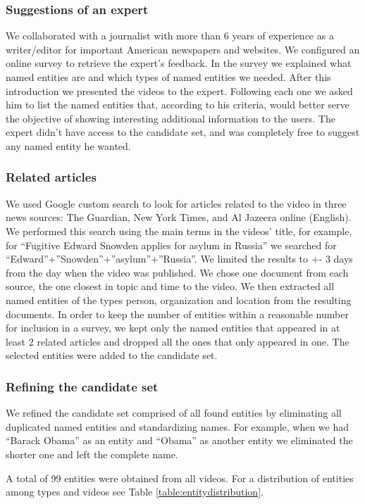 \documentclass{llncs}
\begin{document}
\subsubsection{Suggestions of an expert}
We collaborated with a journalist with more than 6 years of experience as a writer/editor for important American newspapers and websites.  We configured an online survey to retrieve the expert’s feedback. In the survey we explained what named entities are and which types of named entities we needed. After this introduction we presented the videos to the expert. Following each one we asked him to list the named entities that, according to his criteria, would better serve the objective of showing interesting additional information to the users. The expert didn’t have access to the candidate set, and was completely free to suggest any named entity he wanted. 

\subsubsection{Related articles}
We used Google custom search to look for articles related to the video in three news sources: The Guardian, New York Times, and Al Jazeera online (English). We performed this search using the main terms in the videos’ title, for example, for “Fugitive Edward Snowden applies for asylum in Russia” we searched for  “Edward”+”Snowden”+”asylum”+”Russia”. We limited the results to +- 3 days from the day when the video was published. We chose one document from each source, the one closest in topic and time to the video. We then extracted all named entities of the types person, organization and location from the resulting documents. In order to keep the number of entities within a reasonable number for inclusion in a survey, we kept only the named entities that appeared in at least 2 related articles and dropped all the ones that only appeared in one.  The selected entities were added to the candidate set. 

\subsubsection{Refining the candidate set}
We refined the candidate set  comprised of all found entities by eliminating all duplicated named entities and standardizing names. For example, when we had “Barack Obama” as an entity and “Obama” as another entity we eliminated the shorter one and left the complete name. 
	
A total of 99 entities were obtained from all videos. For a distribution of entities among types and videos  see Table \ref{table:entitydistribution}.
\end{document}
